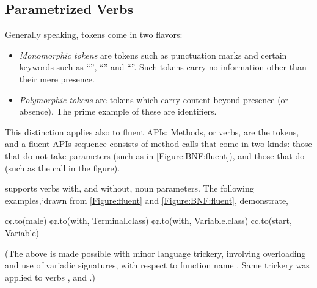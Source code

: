 \subsection{Parametrized Verbs}
Generally speaking, tokens come in two flavors:
\begin{itemize}
  \item \emph{Monomorphic tokens} are tokens such as punctuation marks and
    certain keywords such as ``'', ``'' and ``''.
    Such tokens carry no information other than their mere presence.
  \item \emph{Polymorphic tokens} are tokens which carry content beyond
    presence (or absence).  The prime example of these are identifiers.
\end{itemize}

This distinction applies also to fluent APIs:
Methods, or verbs, are the tokens, and a fluent APIs sequence consists of 
method calls that come in two kinds: those that do not take parameters (such as  in \cref{Figure:BNF:fluent}), 
and those that do (such as the call  in the figure).

\Self supports verbs with, and without, noun parameters. 
The following examples,`drawn from \cref{Figure:fluent} and \cref{Figure:BNF:fluent},
  demonstrate, 
\begin{JAVA}
    ¢¢.to(male)
    ¢¢.to(with, Terminal.class)
    ¢¢.to(with, Variable.class)
    ¢¢.to(start, Variable)\end{JAVA}
(The above is made possible with minor \Java language trickery,
  involving overloading and use of variadic signatures,
  with respect to function name .
Same trickery was applied to verbs , and .)



  
